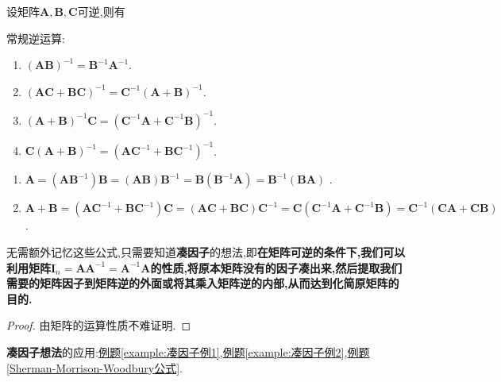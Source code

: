 \documentclass[../../main.tex]{subfiles}%
\begin{document}
\begin{proposition}[矩阵的逆运算]\label{proposition:矩阵的逆运算}
设矩阵$\boldsymbol{A},\boldsymbol{B},\boldsymbol{C}$可逆,则有

常规逆运算:

\begin{enumerate}
\item $\left( \boldsymbol{AB} \right) ^{-1}=\boldsymbol{B}^{-1}\boldsymbol{A}^{-1}$.

\item $\left( \boldsymbol{AC}+\boldsymbol{BC} \right) ^{-1}=\boldsymbol{C}^{-1}\left( \boldsymbol{A}+\boldsymbol{B} \right) ^{-1}$.

\item $\left( \boldsymbol{A}+\boldsymbol{B} \right) ^{-1}\boldsymbol{C}=\left( \boldsymbol{C}^{-1}\boldsymbol{A}+\boldsymbol{C}^{-1}\boldsymbol{B} \right) ^{-1}$.

\item $\boldsymbol{C}\left( \boldsymbol{A}+\boldsymbol{B} \right) ^{-1}=\left( \boldsymbol{AC}^{-1}+\boldsymbol{BC}^{-1} \right) ^{-1}$.
\end{enumerate}
\begin{enumerate}
\item $\boldsymbol{A}=\left( \boldsymbol{AB}^{-1} \right) \boldsymbol{B}=\left( \boldsymbol{AB} \right) \boldsymbol{B}^{-1}=\boldsymbol{B}\left( \boldsymbol{B}^{-1}\boldsymbol{A} \right) =\boldsymbol{B}^{-1}\left( \boldsymbol{BA} \right)$ .

\item $\boldsymbol{A}+\boldsymbol{B}=\left( \boldsymbol{AC}^{-1}+\boldsymbol{BC}^{-1} \right) \boldsymbol{C}=\left( \boldsymbol{AC}+\boldsymbol{BC} \right) \boldsymbol{C}^{-1}=\boldsymbol{C}\left( \boldsymbol{C}^{-1}\boldsymbol{A}+\boldsymbol{C}^{-1}\boldsymbol{B} \right) =\boldsymbol{C}^{-1}\left( \boldsymbol{CA}+\boldsymbol{CB} \right)$ .
\end{enumerate}
\end{proposition}
\begin{note}
无需额外记忆这些公式,只需要知道\textbf{凑因子}的想法,即\textbf{在矩阵可逆的条件下,我们可以利用矩阵$\boldsymbol{I}_n=\boldsymbol{AA}^{-1}=\boldsymbol{A}^{-1}\boldsymbol{A}$的性质,将原本矩阵没有的因子凑出来,然后提取我们需要的矩阵因子到矩阵逆的外面或将其乘入矩阵逆的内部,从而达到化简原矩阵的目的.}
\end{note}
\begin{proof}

由矩阵的运算性质不难证明.

\end{proof}
\begin{remark}
\textbf{凑因子想法}的应用:\hyperref[example:凑因子例1]{例题\ref{example:凑因子例1}},\hyperref[example:凑因子例2]{例题\ref{example:凑因子例2}},\hyperref[Sherman-Morrison-Woodbury公式]{例题\ref{Sherman-Morrison-Woodbury公式}}.
\end{remark}
\end{document}

